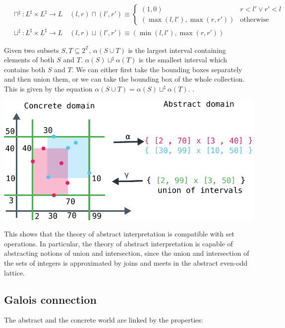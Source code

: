 \documentclass[11pt]{book}
\newcommand{\Z}{\ensuremath{\mathbb Z}}
\begin{document}
\begin{align*}
    &\sqcap^\sharp: L^\sharp \times L^\sharp \rightarrow L \quad (l, r) \sqcap (l', r') \equiv
    \begin{cases}
        (1, 0) & r < l' \lor r' < l \\
        (\max (l, l'), \max (r, r')) & \text{otherwise}
    \end{cases} \\
    &\sqcup^\sharp: L^\sharp \times L^\sharp \rightarrow L \quad (l, r) \sqcup (l', r') \equiv (\min(l, l'), \max(r, r'))
\end{align*}

Given two subsets $S, T \subseteq 2^\Z$, $\alpha(S \cup T)$ is the largest interval
containing elements of both $S$ and $T$. $\alpha(S) \sqcup^\sharp \alpha(T)$ is the
smallest interval which contains  both $S$ and $T$. We can either first take
the bounding boxes separately and then union them, or we can take the bounding box
of the whole collection. This is given by the equation $\alpha(S \cup T) = \alpha(S) \sqcup^\sharp \alpha(T)$.
.

\includegraphics[width=\textwidth]{./union.pdf}

This shows that the theory of abstract interpretation is compatible with set
operations. In particular, the theory of abstract interpretation is capable of
abstracting notions of union and intersection, since the union and intersection
of the sets of integers is approximated by joins and meets in the abstract even-odd
lattice.


\subsection{Galois connection}

The abstract and the concrete world are linked by the properties:
\end{document}
